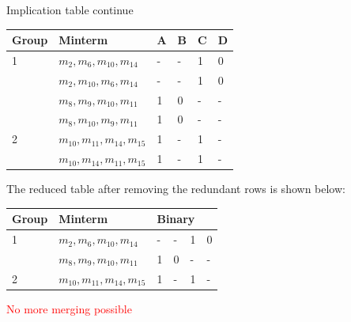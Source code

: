 \documentclass{beamer}
\newcommand{\mcl}[1]{\multicolumn{1}{l|}{#1}}
\begin{document}
\begin{frame}{Implication table continue}
\begin{footnotesize}
        \begin{table}[]
        \begin{tabular}{l|l|l|l|l|l|}
            \hline
            \multicolumn{1}{|l|}{Group}         & Minterm        & A & B & C & D      \\ \hline
            \rowcolor{row1} 1 \multirow{4}{*}{} & $m_2,m_6,m_{10},m_{14}$   & \mcl{-} & \mcl{-} & \mcl{1} & 0  \\ \cline{2-6}
            \rowcolor{row1}                     & $m_2,m_{10},m_6,m_{14}$   & \mcl{-} & \mcl{-} & \mcl{1} & 0  \\ \cline{2-6}
            \rowcolor{row1}                     & $m_8,m_9,m_{10},m_{11}$ & \mcl{1} & \mcl{0} & \mcl{-} & - \\ \cline{2-6}
            \rowcolor{row1}                     & $m_8,m_{10},m_9,m_{11}$ & \mcl{1} & \mcl{0} & \mcl{-} & -  \\ \hline
            \rowcolor{row2} 2 \multirow{4}{*}{} & $m_{10},m_{11},m_{14},m_{15}$ & \mcl{1}  & \mcl{-}  & \mcl{1}  &  - \\ \cline{2-6}
            \rowcolor{row2}                     & $m_{10},m_{14},m_{11},m_{15}$ & \mcl{1}  & \mcl{-}  & \mcl{1}  &  -  \\ \hline
        \end{tabular}
    \end{table}
    \pause
    The reduced table after removing the redundant rows is shown below:
    
    \begin{table}[]
        \begin{tabular}{l|l|llll}
            \hline
            \multicolumn{1}{|l|}{Group}         & Minterm        & \multicolumn{4}{l|}{Binary}     \\ \hline
            \rowcolor{row1} 1 \multirow{4}{*}{} & $m_2,m_6,m_{10},m_{14}$   & \mcl{-} & \mcl{-} & \mcl{1} & 0  \\ \cline{2-6}
            \rowcolor{row1}                     & $m_8,m_9,m_{10},m_{11}$ & \mcl{1} & \mcl{0} & \mcl{-} & - \\ \hline
            \rowcolor{row2} 2 \multirow{4}{*}{} & $m_{10},m_{11},m_{14},m_{15}$ & \mcl{1}  & \mcl{-}  & \mcl{1}  &  - \\ \hline
        \end{tabular}
    \end{table}

\end{footnotesize}
\pause
\textcolor{red}{No more merging possible}  
\end{frame}
\end{document}
